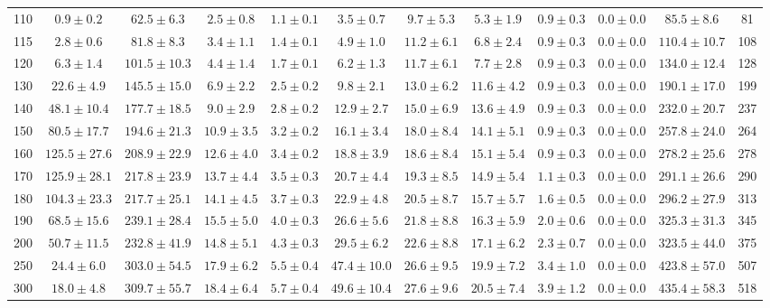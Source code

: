 \begin{table}[!ht]
{\begin{center}
\begin{tabular}{l c c c c c c c c c c c }
 \hline
110 & $0.9\pm0.2$ & $62.5\pm6.3$ & $2.5\pm0.8$ & $1.1\pm0.1$ & $3.5\pm0.7$ & $9.7\pm5.3$ & $5.3\pm1.9$ & $0.9\pm0.3$ & $0.0\pm0.0$ & $85.5\pm8.6$ & 81 \\
115 & $2.8\pm0.6$ & $81.8\pm8.3$ & $3.4\pm1.1$ & $1.4\pm0.1$ & $4.9\pm1.0$ & $11.2\pm6.1$ & $6.8\pm2.4$ & $0.9\pm0.3$ & $0.0\pm0.0$ & $110.4\pm10.7$ & 108 \\
120 & $6.3\pm1.4$ & $101.5\pm10.3$ & $4.4\pm1.4$ & $1.7\pm0.1$ & $6.2\pm1.3$ & $11.7\pm6.1$ & $7.7\pm2.8$ & $0.9\pm0.3$ & $0.0\pm0.0$ & $134.0\pm12.4$ & 128 \\
130 & $22.6\pm4.9$ & $145.5\pm15.0$ & $6.9\pm2.2$ & $2.5\pm0.2$ & $9.8\pm2.1$ & $13.0\pm6.2$ & $11.6\pm4.2$ & $0.9\pm0.3$ & $0.0\pm0.0$ & $190.1\pm17.0$ & 199 \\
140 & $48.1\pm10.4$ & $177.7\pm18.5$ & $9.0\pm2.9$ & $2.8\pm0.2$ & $12.9\pm2.7$ & $15.0\pm6.9$ & $13.6\pm4.9$ & $0.9\pm0.3$ & $0.0\pm0.0$ & $232.0\pm20.7$ & 237 \\
150 & $80.5\pm17.7$ & $194.6\pm21.3$ & $10.9\pm3.5$ & $3.2\pm0.2$ & $16.1\pm3.4$ & $18.0\pm8.4$ & $14.1\pm5.1$ & $0.9\pm0.3$ & $0.0\pm0.0$ & $257.8\pm24.0$ & 264 \\
160 & $125.5\pm27.6$ & $208.9\pm22.9$ & $12.6\pm4.0$ & $3.4\pm0.2$ & $18.8\pm3.9$ & $18.6\pm8.4$ & $15.1\pm5.4$ & $0.9\pm0.3$ & $0.0\pm0.0$ & $278.2\pm25.6$ & 278 \\
170 & $125.9\pm28.1$ & $217.8\pm23.9$ & $13.7\pm4.4$ & $3.5\pm0.3$ & $20.7\pm4.4$ & $19.3\pm8.5$ & $14.9\pm5.4$ & $1.1\pm0.3$ & $0.0\pm0.0$ & $291.1\pm26.6$ & 290 \\
180 & $104.3\pm23.3$ & $217.7\pm25.1$ & $14.1\pm4.5$ & $3.7\pm0.3$ & $22.9\pm4.8$ & $20.5\pm8.7$ & $15.7\pm5.7$ & $1.6\pm0.5$ & $0.0\pm0.0$ & $296.2\pm27.9$ & 313 \\
190 & $68.5\pm15.6$ & $239.1\pm28.4$ & $15.5\pm5.0$ & $4.0\pm0.3$ & $26.6\pm5.6$ & $21.8\pm8.8$ & $16.3\pm5.9$ & $2.0\pm0.6$ & $0.0\pm0.0$ & $325.3\pm31.3$ & 345 \\
200 & $50.7\pm11.5$ & $232.8\pm41.9$ & $14.8\pm5.1$ & $4.3\pm0.3$ & $29.5\pm6.2$ & $22.6\pm8.8$ & $17.1\pm6.2$ & $2.3\pm0.7$ & $0.0\pm0.0$ & $323.5\pm44.0$ & 375 \\
250 & $24.4\pm6.0$ & $303.0\pm54.5$ & $17.9\pm6.2$ & $5.5\pm0.4$ & $47.4\pm10.0$ & $26.6\pm9.5$ & $19.9\pm7.2$ & $3.4\pm1.0$ & $0.0\pm0.0$ & $423.8\pm57.0$ & 507 \\
300 & $18.0\pm4.8$ & $309.7\pm55.7$ & $18.4\pm6.4$ & $5.7\pm0.4$ & $49.6\pm10.4$ & $27.6\pm9.6$ & $20.5\pm7.4$ & $3.9\pm1.2$ & $0.0\pm0.0$ & $435.4\pm58.3$ & 518 \\

\end{tabular}
\end{center}}
\end{table}
